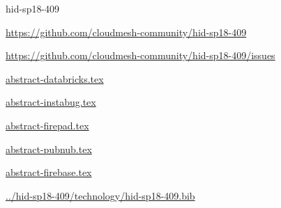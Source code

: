 \begin{IU}

hid-sp18-409

\url{https://github.com/cloudmesh-community/hid-sp18-409}

\url{https://github.com/cloudmesh-community/hid-sp18-409/issues}

\href{https://github.com/cloudmesh-community/hid-sp18-409/blob/master//technology/abstract-databricks.tex}{abstract-databricks.tex}

\href{https://github.com/cloudmesh-community/hid-sp18-409/blob/master//technology/abstract-instabug.tex}{abstract-instabug.tex}

\href{https://github.com/cloudmesh-community/hid-sp18-409/blob/master//technology/abstract-firepad.tex}{abstract-firepad.tex}

\href{https://github.com/cloudmesh-community/hid-sp18-409/blob/master//technology/abstract-pubnub.tex}{abstract-pubnub.tex}

\href{https://github.com/cloudmesh-community/hid-sp18-409/blob/master//technology/abstract-firebase.tex}{abstract-firebase.tex}

\href{https://github.com/cloudmesh-community/hid-sp18-409/blob/master//technology/hid-sp18-409.bib}{../hid-sp18-409/technology/hid-sp18-409.bib}

\end{IU}


